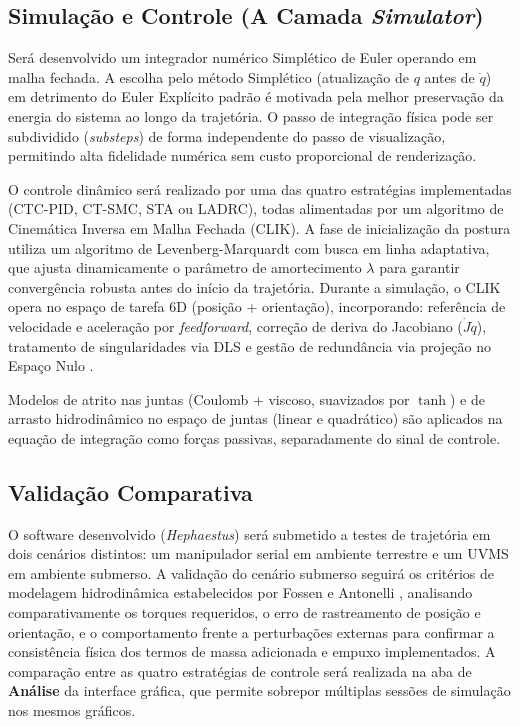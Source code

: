 \subsection{Simulação e Controle (A Camada \textit{Simulator}) }
\label{sec:simulador}
Será desenvolvido um integrador numérico Simplético de Euler operando em malha fechada. A escolha pelo método Simplético (atualização de $q$ antes de $\dot{q}$) em detrimento do Euler Explícito padrão é motivada pela melhor preservação da energia do sistema ao longo da trajetória. O passo de integração física pode ser subdividido (\textit{substeps}) de forma independente do passo de visualização, permitindo alta fidelidade numérica sem custo proporcional de renderização.

O controle dinâmico será realizado por uma das quatro estratégias implementadas (CTC-PID, CT-SMC, STA ou LADRC), todas alimentadas por um algoritmo de Cinemática Inversa em Malha Fechada (CLIK). A fase de inicialização da postura utiliza um algoritmo de Levenberg-Marquardt com busca em linha adaptativa, que ajusta dinamicamente o parâmetro de amortecimento $\lambda$ para garantir convergência robusta antes do início da trajetória. Durante a simulação, o CLIK opera no espaço de tarefa 6D (posição + orientação), incorporando: referência de velocidade e aceleração por \textit{feedforward}, correção de deriva do Jacobiano ($\dot{J}\dot{q}$), tratamento de singularidades via DLS \cite{nakamura1986inverse} e gestão de redundância via projeção no Espaço Nulo \cite{chiaverini1997singularity}.

Modelos de atrito nas juntas (Coulomb + viscoso, suavizados por $\tanh$) e de arrasto hidrodinâmico no espaço de juntas (linear e quadrático) são aplicados na equação de integração como forças passivas, separadamente do sinal de controle.

\subsection{Validação Comparativa}
O software desenvolvido (\textit{Hephaestus}) será submetido a testes de trajetória em dois cenários distintos: um manipulador serial em ambiente terrestre e um UVMS em ambiente submerso. A validação do cenário submerso seguirá os critérios de modelagem hidrodinâmica estabelecidos por Fossen e Antonelli \cite{fossen2011handbook, antonelli2014modelling}, analisando comparativamente os torques requeridos, o erro de rastreamento de posição e orientação, e o comportamento frente a perturbações externas para confirmar a consistência física dos termos de massa adicionada e empuxo implementados. A comparação entre as quatro estratégias de controle será realizada na aba de \textbf{Análise} da interface gráfica, que permite sobrepor múltiplas sessões de simulação nos mesmos gráficos.
